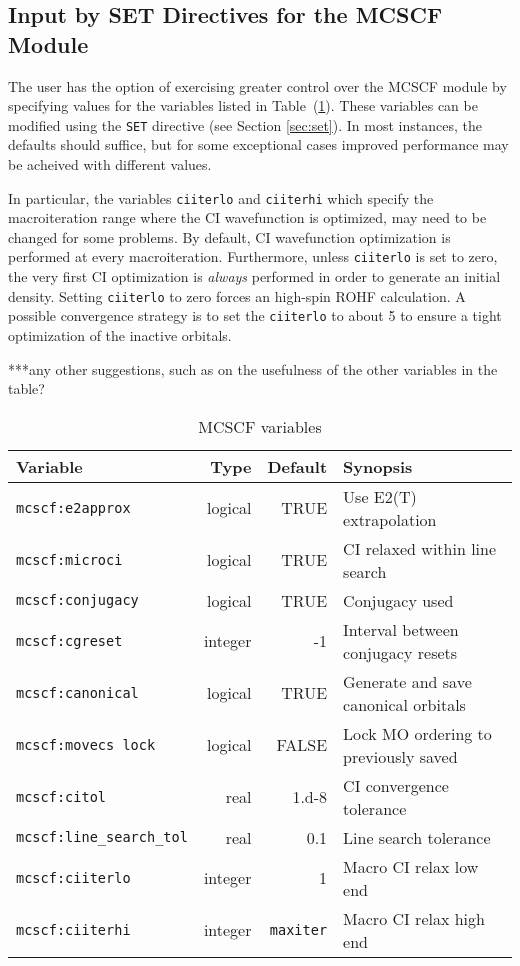 \subsection{Input by SET Directives for the MCSCF Module}

The user has the option of exercising greater control over the MCSCF 
module by specifying values for the variables listed in 
Table~(\ref{MCSCF_variables}).  These variables can be modified using
the \verb+SET+ directive (see Section \ref{sec:set}).  In most instances, the
defaults should suffice, but for some exceptional cases improved performance
may be acheived with different values.

In particular, the variables \verb+ciiterlo+ and \verb+ciiterhi+ which
specify the macroiteration range where the CI wavefunction is optimized,
may need to be changed for some problems. By
default, CI wavefunction optimization is performed at every
macroiteration. Furthermore, unless \verb+ciiterlo+ is set to zero,
the very first CI optimization is {\em always} performed in order to
generate an initial density. Setting \verb+ciiterlo+ to zero
forces an high-spin ROHF calculation. A possible convergence strategy
is to set the \verb+ciiterlo+ to about 5 to ensure a tight
optimization of the inactive orbitals.

\Large
***any other suggestions, such as on the usefulness of the other
variables in the table?
\normalsize

\begin{table}
\caption{MCSCF variables}
\label{MCSCF_variables}
\vspace{.2in}
\begin{tabular}{lrrl}
\hline\hline
Variable                        & Type     & Default          & Synopsis \\
\hline
\verb+mcscf:e2approx+           & logical  &  TRUE            & Use E2(T) extrapolation \\
\verb+mcscf:microci+            & logical  &  TRUE            & CI relaxed within line search \\
\verb+mcscf:conjugacy+          & logical  &  TRUE            & Conjugacy used \\
\verb+mcscf:cgreset+            & integer  &  -1              & Interval between conjugacy resets \\
\verb+mcscf:canonical+          & logical  &  TRUE            & Generate and save canonical orbitals \\
\verb+mcscf:movecs lock+        & logical  &  FALSE           & Lock MO ordering to previously saved \\
\verb+mcscf:citol+              & real     &  1.d-8           & CI convergence tolerance \\
\verb+mcscf:line_search_tol+    & real     &  0.1             & Line search tolerance  \\
\verb+mcscf:ciiterlo+           & integer  &  1               & Macro CI relax low end \\
\verb+mcscf:ciiterhi+           & integer  &  \verb+maxiter+  & Macro CI relax high end \\
\hline\hline
\end{tabular}
\end{table}

